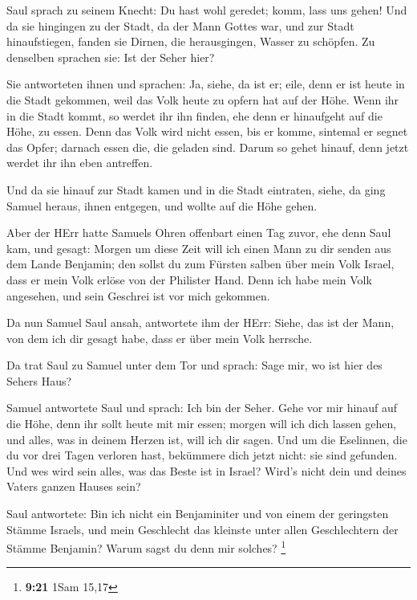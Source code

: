  Saul sprach zu seinem Knecht: Du hast wohl geredet;
komm, lass uns gehen! Und da sie hingingen zu der Stadt, da der Mann
Gottes war,  und zur Stadt hinaufstiegen, fanden sie
Dirnen, die herausgingen, Wasser zu schöpfen. Zu denselben sprachen sie:
Ist der Seher hier?

 Sie antworteten ihnen und sprachen: Ja, siehe, da ist
er; eile, denn er ist heute in die Stadt gekommen, weil das Volk heute
zu opfern hat auf der Höhe.  Wenn ihr in die Stadt kommt,
so werdet ihr ihn finden, ehe denn er hinaufgeht auf die Höhe, zu essen.
Denn das Volk wird nicht essen, bis er komme, sintemal er segnet das
Opfer; darnach essen die, die geladen sind. Darum so gehet hinauf, denn
jetzt werdet ihr ihn eben antreffen.

 Und da sie hinauf zur Stadt kamen und in die Stadt
eintraten, siehe, da ging Samuel heraus, ihnen entgegen, und wollte auf
die Höhe gehen.

 Aber der HErr hatte Samuels Ohren offenbart einen Tag
zuvor, ehe denn Saul kam, und gesagt:  Morgen um diese
Zeit will ich einen Mann zu dir senden aus dem Lande Benjamin; den
sollst du zum Fürsten salben über mein Volk Israel, dass er mein Volk
erlöse von der Philister Hand. Denn ich habe mein Volk angesehen, und
sein Geschrei ist vor mich gekommen.

 Da nun Samuel Saul ansah, antwortete ihm der HErr:
Siehe, das ist der Mann, von dem ich dir gesagt habe, dass er über mein
Volk herrsche.

 Da trat Saul zu Samuel unter dem Tor und sprach: Sage
mir, wo ist hier des Sehers Haus?

 Samuel antwortete Saul und sprach: Ich bin der Seher.
Gehe vor mir hinauf auf die Höhe, denn ihr sollt heute mit mir essen;
morgen will ich dich lassen gehen, und alles, was in deinem Herzen ist,
will ich dir sagen.  Und um die Eselinnen, die du vor
drei Tagen verloren hast, bekümmere dich jetzt nicht: sie sind gefunden.
Und wes wird sein alles, was das Beste ist in Israel? Wird's nicht dein
und deines Vaters ganzen Hauses sein?

 Saul antwortete: Bin ich nicht ein Benjaminiter und von
einem der geringsten Stämme Israels, und mein Geschlecht das kleinste
unter allen Geschlechtern der Stämme Benjamin? Warum sagst du denn mir
solches? \footnote{\textbf{9:21} 1Sam 15,17}

